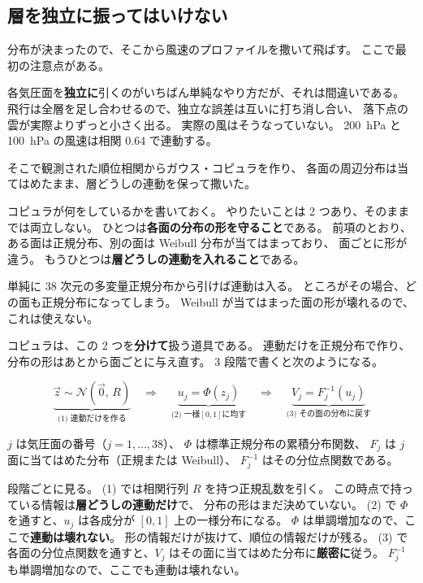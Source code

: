 \subsection{層を独立に振ってはいけない}

分布が決まったので、そこから風速のプロファイルを撒いて飛ばす。
ここで最初の注意点がある。

各気圧面を\textbf{独立に}引くのがいちばん単純なやり方だが、それは間違いである。
飛行は全層を足し合わせるので、独立な誤差は互いに打ち消し合い、
落下点の雲が実際よりずっと小さく出る。
実際の風はそうなっていない。
\SI{200}{\hecto\pascal} と \SI{100}{\hecto\pascal} の風速は相関 0.64 で連動する。

そこで観測された順位相関からガウス・コピュラを作り、
各面の周辺分布は当てはめたまま、層どうしの連動を保って撒いた。

コピュラが何をしているかを書いておく。
やりたいことは 2 つあり、そのままでは両立しない。
ひとつは\textbf{各面の分布の形を守ること}である。
前項のとおり、ある面は正規分布、別の面は Weibull 分布が当てはまっており、
面ごとに形が違う。
もうひとつは\textbf{層どうしの連動を入れること}である。

単純に 38 次元の多変量正規分布から引けば連動は入る。
ところがその場合、どの面も正規分布になってしまう。
Weibull が当てはまった面の形が壊れるので、これは使えない。

コピュラは、この 2 つを\textbf{分けて}扱う道具である。
連動だけを正規分布で作り、
分布の形はあとから面ごとに与え直す。
3 段階で書くと次のようになる。

\begin{equation*}
\underbrace{\vec{z} \sim \mathcal{N}(\vec{0},\, R)}_{\text{(1) 連動だけを作る}}
\quad\Longrightarrow\quad
\underbrace{u_j = \Phi(z_j)}_{\text{(2) 一様}[0,1]\text{に均す}}
\quad\Longrightarrow\quad
\underbrace{V_j = F_j^{-1}(u_j)}_{\text{(3) その面の分布に戻す}}
\end{equation*}

$j$ は気圧面の番号（$j = 1, \dots, 38$）、
$\Phi$ は標準正規分布の累積分布関数、
$F_j$ は $j$ 面に当てはめた分布（正規または Weibull）、
$F_j^{-1}$ はその分位点関数である。

段階ごとに見る。
(1) では相関行列 $R$ を持つ正規乱数を引く。
この時点で持っている情報は\textbf{層どうしの連動だけ}で、
分布の形はまだ決めていない。
(2) で $\Phi$ を通すと、$u_j$ は各成分が $[0, 1]$ 上の一様分布になる。
$\Phi$ は単調増加なので、ここで\textbf{連動は壊れない}。
形の情報だけが抜けて、順位の情報だけが残る。
(3) で各面の分位点関数を通すと、$V_j$ はその面に当てはめた分布に\textbf{厳密に}従う。
$F_j^{-1}$ も単調増加なので、ここでも連動は壊れない。

